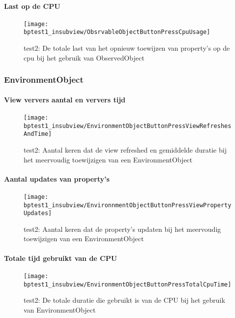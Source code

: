 \paragraph{Last op de CPU}
\begin{figure}[H]
    \centering
    \texttt{[image: bptest1\_insubview/ObsrvableObjectButtonPressCpuUsage]} 
    \caption{test2: De totale last van het opnieuw toewijzen van property's op de cpu bij het gebruik van ObservedObject}
    \label{fig:cpuWeightObservedObject1}
\end{figure}

\subsubsection{EnvironmentObject}
\paragraph{View ververs aantal en ververs tijd}
\begin{figure}[H]
    \centering
    \texttt{[image: bptest1\_insubview/EnvironmentObjectButtonPressViewRefreshesAndTime]} 
    \caption{test2: Aantal keren dat de view refreshed en gemiddelde duratie bij het meervoudig toewijzigen van een EnvironmentObject}
    \label{fig:viewRefresheEnvironmentObject1}
\end{figure}
\paragraph{Aantal updates van property's}
\begin{figure}[H]
    \centering
    \texttt{[image: bptest1\_insubview/EnvironnmentObjectButtonPressViewPropertyUpdates]} 
    \caption{test2: Aantal keren dat de property's updaten bij het meervoudig toewijzigen van een EnvironmentObject}
    \label{fig:propertyUpdatesEnvironmentObject1}
\end{figure}
\paragraph{Totale tijd gebruikt van de CPU}
\begin{figure}[H]
    \centering
    \texttt{[image: bptest1\_insubview/EnvironmentObjectButtonPressTotalCpuTime]} 
    \caption{test2: De totale duratie die gebruikt is van de CPU bij het gebruik van EnvironmentObject}
    \label{fig:cpuUsageTimeEnvironmentObject1}
\end{figure}
